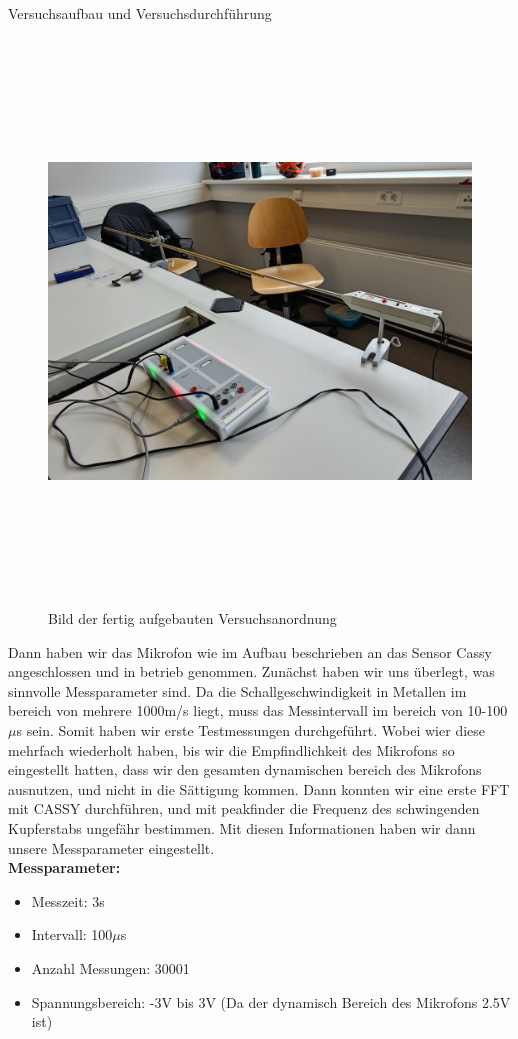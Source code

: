 \documentclass[twoside]{protokoll}
\begin{document}
\begin{aufgabe}{Versuchsaufbau und Versuchsdurchführung}
\begin{figure}[h]
  \centering
  \includegraphics[width=15cm,height=15cm,keepaspectratio]{Bilder/Gesamtaufbau.jpeg}
  \caption{Bild der fertig aufgebauten Versuchsanordnung}
  \label{fig:image_label}
  \centering
\end{figure}

Dann haben wir das Mikrofon wie im Aufbau beschrieben an das Sensor Cassy angeschlossen und in betrieb genommen. Zunächst haben wir uns überlegt, was sinnvolle Messparameter sind. Da die Schallgeschwindigkeit in Metallen im bereich von mehrere 1000m/s liegt, muss das Messintervall im bereich von 10-100$\mu$s sein. Somit haben wir erste Testmessungen durchgeführt. Wobei wier diese mehrfach wiederholt haben, bis wir die Empfindlichkeit des Mikrofons so eingestellt hatten, dass wir den gesamten dynamischen bereich des Mikrofons ausnutzen, und nicht in die Sättigung kommen. Dann konnten wir eine erste FFT mit CASSY durchführen, und mit peakfinder die Frequenz des schwingenden Kupferstabs ungefähr bestimmen. Mit diesen Informationen haben wir dann unsere Messparameter eingestellt.\\

\textbf{Messparameter:}
\begin{itemize}
\item Messzeit: 3s
\item Intervall: 100$\mu$s
\item Anzahl Messungen: 30001
\item Spannungsbereich: -3V bis 3V (Da der dynamisch Bereich des Mikrofons 2.5V ist)
\end{itemize}


\end{aufgabe}
\end{document}
